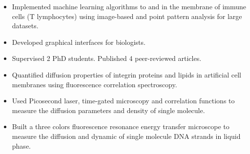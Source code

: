 \documentclass[10pt,a4paper,ragged2e,withhyper]{altacv}
\begin{document}
\begin{paracol}{2}
\begin{itemize}
            	   	\item Implemented machine learning algorithms to  and  in the membrane of immune cells (T lymphocytes) using image-based and point pattern analysis for large datasets.
	   		        \item Developed graphical interfaces for biologists.
	   		        \item Supervised 2 PhD students. Published 4 peer-reviewed articles.
                
            \end{itemize}
            \divider
            
            \begin{itemize}
                \item Quantified diffusion properties of integrin proteins and lipids in artificial cell membranes using fluorescence correlation spectroscopy.
                \item Used Picosecond laser, time-gated microscopy and correlation functions to measure the diffusion parameters and density of single molecule. 
            \end{itemize}            
             \divider           
            \begin{itemize}
                \item Built a three colors fluorescence resonance energy transfer microscope to measure the diffusion and dynamic of single molecule DNA strands in liquid phase.     
            \end{itemize}
        

        
            

\end{paracol}
\end{document}
